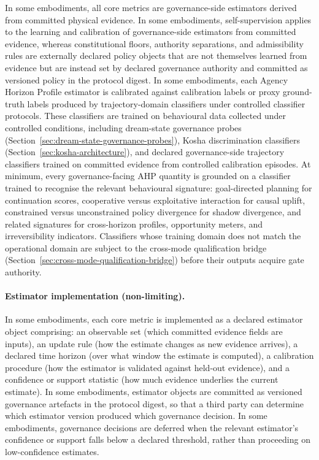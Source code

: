 \documentclass[a4paper,12pt]{article}
\begin{document}
In some embodiments, all core metrics are governance-side estimators
derived from committed physical evidence. In some embodiments,
self-supervision applies to the learning and calibration of
governance-side estimators from committed evidence, whereas
constitutional floors, authority separations, and admissibility rules
are externally declared policy objects that are not themselves learned
from evidence but are instead set by declared governance authority and
committed as versioned policy in the protocol digest.
In some embodiments, each Agency Horizon Profile estimator is
calibrated against calibration labels or proxy ground-truth labels
produced by trajectory-domain classifiers under controlled
classifier protocols. These classifiers are trained on behavioural data
collected under controlled conditions, including dream-state
governance probes (Section~\ref{sec:dream-state-governance-probes}),
Kosha discrimination classifiers
(Section~\ref{sec:kosha-architecture}), and declared governance-side
trajectory classifiers trained on committed evidence from controlled
calibration episodes. At minimum, every governance-facing AHP
quantity is grounded on a classifier trained to recognise the
relevant behavioural signature: goal-directed planning for
continuation scores, cooperative versus exploitative interaction for
causal uplift, constrained versus unconstrained policy divergence for
shadow divergence, and related signatures for cross-horizon profiles,
opportunity meters, and irreversibility indicators. Classifiers whose
training domain does not match the operational domain are subject to
the cross-mode qualification bridge
(Section~\ref{sec:cross-mode-qualification-bridge}) before their
outputs acquire gate authority.
\paragraph{Estimator implementation (non-limiting).}
In some embodiments, each core metric is implemented as a declared
estimator object comprising: an observable set (which committed
evidence fields are inputs), an update rule (how the estimate changes
as new evidence arrives), a declared time horizon (over what window
the estimate is computed), a calibration procedure (how the estimator
is validated against held-out evidence), and a confidence or support
statistic (how much evidence underlies the current estimate). In some
embodiments, estimator objects are committed as versioned governance
artefacts in the protocol digest, so that a third party can determine
which estimator version produced which governance decision. In some
embodiments, governance decisions are deferred when the relevant
estimator's confidence or support falls below a declared threshold,
rather than proceeding on low-confidence estimates.
\end{document}

